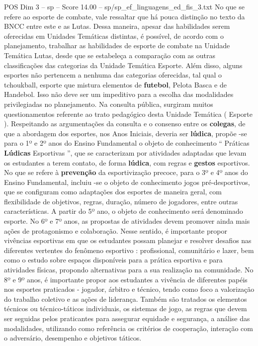 \begin{textsample}{POS Dim 3 – sp – Score 14.00 – sp/sp\_ef\_linguagens\_ed\_fis\_3.txt}
No que se refere ao esporte de combate, vale ressaltar que há pouca distinção no texto da BNCC entre este e as Lutas.
Dessa maneira, apesar das habilidades serem oferecidas em Unidades Temáticas distintas, é possível, de acordo com o planejamento, trabalhar as habilidades de esporte de combate na Unidade Temática Lutas, desde que se estabeleça a comparação com as outras classificações das categorias da Unidade Temática Esporte.
Além disso, alguns esportes não pertencem a nenhuma das categorias oferecidas, tal qual o tchoukball, esporte que mistura elementos de \textbf{futebol}, Pelota Basca e de Handebol.
Isso não deve ser um impeditivo para a escolha das modalidades privilegiadas no planejamento.
Na consulta pública, surgiram muitos questionamentos referente ao trato pedagógico desta Unidade Temática ( Esporte ).
Respeitando as argumentações da consulta e o consenso entre os \textbf{colegas}, de que a abordagem dos esportes, nos Anos Iniciais, deveria ser \textbf{lúdica}, propõe -se para o 1º e 2º anos do Ensino Fundamental o objeto de conhecimento “ Práticas \textbf{Lúdicas} Esportivas ”, que se caracterizam por atividades adaptadas que levam os estudantes a terem contato, de forma \textbf{lúdica}, com regras e \textbf{gestos} esportivos.
No que se refere à \textbf{prevenção} da esportivização precoce, para o 3º e 4º anos do Ensino Fundamental, incluiu -se o objeto de conhecimento jogos pré-desportivos, que se configuram como adaptações dos esportes de maneira geral, com flexibilidade de objetivos, regras, duração, número de jogadores, entre outras características.
A partir do 5º ano, o objeto de conhecimento será denominado esporte.
No 6º e 7º anos, as propostas de atividades devem promover ainda mais ações de protagonismo e colaboração.
Nesse sentido, é importante propor vivências esportivas em que os estudantes possam planejar e resolver desafios nas diferentes vertentes do fenômeno esportivo : profissional, comunitário e lazer, bem como o estudo sobre espaços disponíveis para a prática esportiva e para atividades físicas, propondo alternativas para a sua realização na comunidade.
No 8º e 9º anos, é importante propor aos estudantes a vivência de diferentes papéis nos esportes praticados - jogador, árbitro e técnico, tendo como foco a valorização do trabalho coletivo e as ações de liderança.
Também são tratados os elementos técnicos ou técnico-táticos individuais, os sistemas de jogo, as regras que devem ser seguidas pelos praticantes para assegurar equidade e segurança, a análise das modalidades, utilizando como referência os critérios de cooperação, interação com o adversário, desempenho e objetivos táticos.

\end{textsample}
